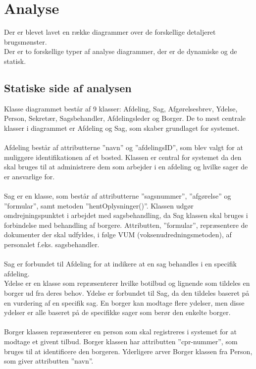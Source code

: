 \section{Analyse}
Der er blevet lavet en række diagrammer over de forskellige detaljeret brugsmønster.\\
Der er to forskellige typer af analyse diagrammer, der er de dynamiske og de statisk.

\subsection{Statiske side af analysen}
Klasse diagrammet består af 9 klasser: Afdeling, Sag, Afgørelsesbrev, Ydelse, Person, Sekretær, Sagsbehandler, Afdelingsleder og Borger. De to mest centrale klasser i diagrammet er Afdeling og Sag, som skaber grundlaget for systemet. \\ \\
Afdeling består af attributterne ”navn” og ”afdelingsID”, som blev valgt for at muliggøre identifikationen af et bosted. Klassen er central for systemet da den skal bruges til at administrere dem som arbejder i en afdeling og hvilke sager de er ansvarlige for. \\ \\
Sag er en klasse, som består af attributterne ”sagsnummer”, ”afgørelse” og ”formular”, samt metoden ”hentOplysninger()”. Klassen udgør omdrejningspunktet i arbejdet med sagsbehandling, da Sag klassen skal bruges i forbindelse med behandling af borgere. Attributten, ”formular”, repræsentere de dokumenter der skal udfyldes, i følge VUM (voksenudredningsmetoden), af personalet f.eks. sagsbehandler. \\ \\
Sag er forbundet til Afdeling for at indikere at en sag behandles i en specifik afdeling.\\
Ydelse er en klasse som repræsenterer hvilke botilbud og lignende som tildeles en borger ud fra deres behov. Ydelse er forbundet til Sag, da den tildeles baseret på en vurdering af en specifik sag. En borger kan modtage flere ydelser, men disse ydelser er alle baseret på de specifikke sager som berør den enkelte borger.\\ \\
Borger klassen repræsenterer en person som skal registreres i systemet for at modtage et givent tilbud. Borger klassen har attributten ”cpr-nummer”, som bruges til at identificere den borgeren. Yderligere arver Borger klassen fra Person, som giver attributten ”navn”.\\ \\

